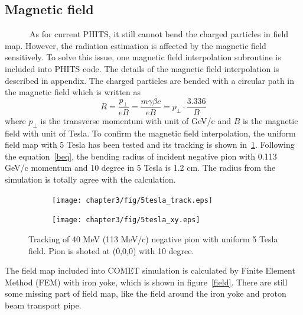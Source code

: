  \subsection{Magnetic field}
~~~~~~As for current PHITS, it still cannot bend the charged particles in field map.
However, the radiation estimation is affected by the magnetic field sensitively.
To solve this issue, one magnetic field interpolation subroutine is included into PHITS code.
The details of the magnetic field interpolation is described in appendix.
The charged particles are bended with a circular path in the magnetic field which is written as
\begin{equation}
 R = \frac{p_\perp}{eB} = \frac{m\gamma \beta c}{eB} = p_\perp \cdot \frac{3.336}{B}
\label{beq}
\end{equation}
where $p_\perp$ is the transverse momentum with unit of GeV/c and $B$ is the magnetic field with unit of Tesla.
To confirm the magnetic field interpolation, the uniform field map with 5 Tesla has been tested and its tracking is shown in~\ref{2uniform}.
Following the equation~\ref{beq}, the bending radius of incident negative pion with 0.113 GeV/c momentum and 10 degree in 5 Tesla is 1.2 cm.
The radius from the simulation is totally agree with the calculation.
\begin{figure}[H]
 \begin{subfigure}{0.3\textwidth}
 \centering
 \texttt{[image: chapter3/fig/5tesla\_track.eps]}
 \end{subfigure}
 \hspace{0.2\textwidth}
 \begin{subfigure}{0.3\textwidth}
 \centering
 \texttt{[image: chapter3/fig/5tesla\_xy.eps]}
 \end{subfigure}
 \caption{Tracking of 40 MeV (113 MeV/c) negative pion with uniform 5 Tesla field. Pion is shoted at (0,0,0) with 10 degree.}
 \label{2uniform}
\end{figure}
The field map included into COMET simulation is calculated by Finite Element Method (FEM) with iron yoke, which is shown in figure~\ref{field}.
There are still some missing part of field map, like the field around the iron yoke and proton beam transport pipe.

